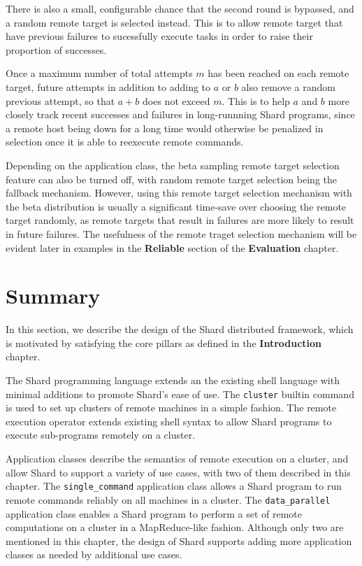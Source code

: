 \documentclass[twoside]{report}
\begin{document}
There is also a small, configurable chance that the second round is bypassed, and a random remote target is selected instead.
This is to allow remote target that have previous failures to sucessfully execute tasks in order to raise their proportion of successes.

Once a maximum number of total attempts $m$ has been reached on each remote target, future attempts in addition to adding to $a$ or $b$ also remove a random previous attempt, so that $a+b$ does not exceed $m$.
This is to help $a$ and $b$ more closely track recent successes and failures in long-runnning Shard programs, since a remote host being down for a long time would otherwise be penalized in selection once it is able to reexecute remote commands.

Depending on the application class, the beta sampling remote target selection feature can also be turned off, with random remote target selection being the fallback mechanism.
However, using this remote target selection mechanism with the beta distribution is usually a significant time-save over choosing the remote target randomly, as remote targets that result in failures are more likely to result in future failures.
The usefulness of the remote traget selection mechanism will be evident later in examples in the \textbf{Reliable} section of the \textbf{Evaluation} chapter.

\section{Summary}

In this section, we describe the design of the Shard distributed framework, which is motivated by satisfying the core pillars as defined in the \textbf{Introduction} chapter.

The Shard programming language extends an the existing shell language with minimal additions to promote Shard's ease of use.
The \texttt{cluster} builtin command is used to set up clusters of remote machines in a simple fashion.
The remote execution operator extends existing shell syntax to allow Shard programs to execute sub-programs remotely on a cluster.

Application classes describe the semantics of remote execution on a cluster, and allow Shard to support a variety of use cases, with two of them described in this chapter.
The \texttt{single\_command} application class allows a Shard program to run remote commands reliably on all machines in a cluster.
The \texttt{data\_parallel} application class enables a Shard program to perform a set of remote computations on a cluster in a MapReduce-like fashion.
Although only two are mentioned in this chapter, the design of Shard supports adding more application classes as needed by additional use cases.
\end{document}
